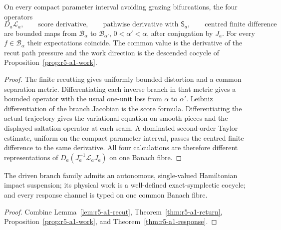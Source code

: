 \begin{theorem}
\label{thm:r5-a1-response}
On every compact parameter interval avoiding grazing bifurcations, the four
operators
\[
 D_a{\mathcal L}_a,\qquad
 \text{score derivative},\qquad
 \text{pathwise derivative with }{\mathsf S}_a,\qquad
 \text{centred finite difference}
\]
are bounded maps from \(\mathscr B_\alpha\) to
\(\mathscr B_{\alpha'}\), \(0<\alpha'<\alpha\), after conjugation by \(J_a\).
For every \(f\in\mathscr B_\alpha\) their expectations coincide.  The common
value is the derivative of the recut path pressure and the work direction is
the descended cocycle of Proposition~\ref{prop:r5-a1-work}.
\end{theorem}

\begin{proof}
The finite recutting gives uniformly bounded distortion and a common
separation metric.  Differentiating each inverse branch in that metric gives
a bounded operator with the usual one-unit loss from \(\alpha\) to
\(\alpha'\).  Leibniz differentiation of the branch Jacobian is the score
formula.  Differentiating the actual trajectory gives the variational
equation on smooth pieces and the displayed saltation operator at each seam.
A dominated second-order Taylor estimate, uniform on the compact parameter
interval, passes the centred finite difference to the same derivative.
All four calculations are therefore different representations of
\(D_a(J_a^{-1}{\mathcal L}_aJ_a)\) on one Banach fibre.
\end{proof}

\begin{theorem}
\label{thm:r5-a1-main}
The driven branch family admits an autonomous, single-valued Hamiltonian
impact suspension; its physical work is a well-defined exact-symplectic
cocycle; and every response channel is typed on one common Banach fibre.
\end{theorem}

\begin{proof}
Combine Lemma~\ref{lem:r5-a1-recut},
Theorem~\ref{thm:r5-a1-return},
Proposition~\ref{prop:r5-a1-work}, and
Theorem~\ref{thm:r5-a1-response}.
\end{proof}
